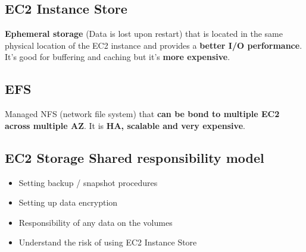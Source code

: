 \subsection{EC2 Instance Store}
\textbf{Ephemeral storage} (Data is lost upon restart) that is located in the same physical location of the EC2 instance and provides a \textbf{better I/O performance}. It's good for buffering and caching but it's \textbf{more expensive}.

\subsection{EFS}
Managed NFS (network file system) that \textbf{can be bond to multiple EC2 across multiple AZ}. It is \textbf{HA, scalable and very expensive}.

\subsection{EC2 Storage Shared responsibility model}
\begin{itemize}
	\item{Setting backup / snapshot procedures}
	\item{Setting up data encryption}
	\item{Responsibility of any data on the volumes}
	\item{Understand the risk of using EC2 Instance Store}
\end{itemize}